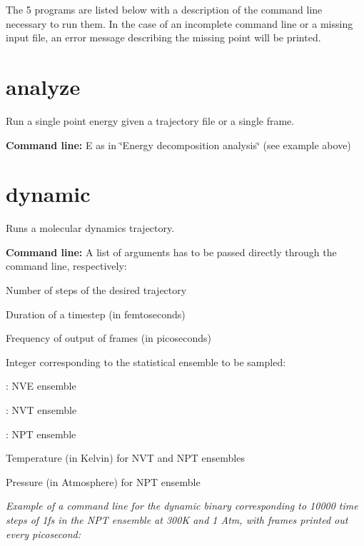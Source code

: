 The 5 programs are listed below with a description of the command line necessary to run them. In the case of an incomplete command line or a missing input file, an error message describing the missing point will be printed.\hypertarget{md_binaries_doxygen_program_analyze}{}\section{analyze}\label{md_binaries_doxygen_program_analyze}
Run a single point energy given a trajectory file or a single frame.
\begin{DoxyItemize}
\item {\bfseries Command line\-:} {\ttfamily E} as in \char`\"{}\-Energy decomposition analysis\char`\"{} (see example above)
\end{DoxyItemize}\hypertarget{md_binaries_doxygen_program_dynamic}{}\section{dynamic}\label{md_binaries_doxygen_program_dynamic}
Runs a molecular dynamics trajectory.
\begin{DoxyItemize}
\item {\bfseries Command line\-:} A list of arguments has to be passed directly through the command line, respectively\-:
\begin{DoxyItemize}
\item Number of steps of the desired trajectory
\item Duration of a timestep (in femtoseconds)
\item Frequency of output of frames (in picoseconds)
\item Integer corresponding to the statistical ensemble to be sampled\-:
\begin{DoxyItemize}
\item {}\-: N\-V\-E ensemble
\item {}\-: N\-V\-T ensemble
\item {}\-: N\-P\-T ensemble
\end{DoxyItemize}
\item Temperature (in Kelvin) for N\-V\-T and N\-P\-T ensembles
\item Pressure (in Atmosphere) for N\-P\-T ensemble
\end{DoxyItemize}
\end{DoxyItemize}

{\itshape Example of a command line for the dynamic binary corresponding to 10000 time steps of 1fs in the N\-P\-T ensemble at 300\-K and 1 Atm, with frames printed out every picosecond\-:}


